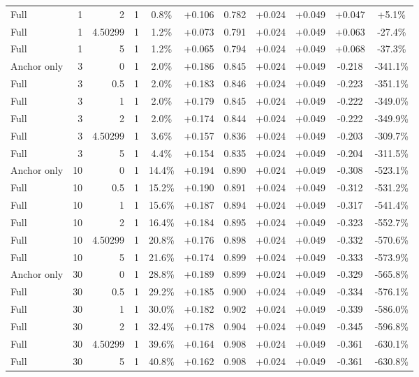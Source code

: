 \begin{table}[htbp]
\begin{tabular}{lrrrccccccc}
Full & 1 & 2 & 1 & 0.8\% & +0.106 & 0.782 & +0.024 & +0.049 & +0.047 & +5.1\% \\
Full & 1 & 4.50299 & 1 & 1.2\% & +0.073 & 0.791 & +0.024 & +0.049 & +0.063 & -27.4\% \\
Full & 1 & 5 & 1 & 1.2\% & +0.065 & 0.794 & +0.024 & +0.049 & +0.068 & -37.3\% \\
Anchor only & 3 & 0 & 1 & 2.0\% & +0.186 & 0.845 & +0.024 & +0.049 & -0.218 & -341.1\% \\
Full & 3 & 0.5 & 1 & 2.0\% & +0.183 & 0.846 & +0.024 & +0.049 & -0.223 & -351.1\% \\
Full & 3 & 1 & 1 & 2.0\% & +0.179 & 0.845 & +0.024 & +0.049 & -0.222 & -349.0\% \\
Full & 3 & 2 & 1 & 2.0\% & +0.174 & 0.844 & +0.024 & +0.049 & -0.222 & -349.9\% \\
Full & 3 & 4.50299 & 1 & 3.6\% & +0.157 & 0.836 & +0.024 & +0.049 & -0.203 & -309.7\% \\
Full & 3 & 5 & 1 & 4.4\% & +0.154 & 0.835 & +0.024 & +0.049 & -0.204 & -311.5\% \\
Anchor only & 10 & 0 & 1 & 14.4\% & +0.194 & 0.890 & +0.024 & +0.049 & -0.308 & -523.1\% \\
Full & 10 & 0.5 & 1 & 15.2\% & +0.190 & 0.891 & +0.024 & +0.049 & -0.312 & -531.2\% \\
Full & 10 & 1 & 1 & 15.6\% & +0.187 & 0.894 & +0.024 & +0.049 & -0.317 & -541.4\% \\
Full & 10 & 2 & 1 & 16.4\% & +0.184 & 0.895 & +0.024 & +0.049 & -0.323 & -552.7\% \\
Full & 10 & 4.50299 & 1 & 20.8\% & +0.176 & 0.898 & +0.024 & +0.049 & -0.332 & -570.6\% \\
Full & 10 & 5 & 1 & 21.6\% & +0.174 & 0.899 & +0.024 & +0.049 & -0.333 & -573.9\% \\
Anchor only & 30 & 0 & 1 & 28.8\% & +0.189 & 0.899 & +0.024 & +0.049 & -0.329 & -565.8\% \\
Full & 30 & 0.5 & 1 & 29.2\% & +0.185 & 0.900 & +0.024 & +0.049 & -0.334 & -576.1\% \\
Full & 30 & 1 & 1 & 30.0\% & +0.182 & 0.902 & +0.024 & +0.049 & -0.339 & -586.0\% \\
Full & 30 & 2 & 1 & 32.4\% & +0.178 & 0.904 & +0.024 & +0.049 & -0.345 & -596.8\% \\
Full & 30 & 4.50299 & 1 & 39.6\% & +0.164 & 0.908 & +0.024 & +0.049 & -0.361 & -630.1\% \\
Full & 30 & 5 & 1 & 40.8\% & +0.162 & 0.908 & +0.024 & +0.049 & -0.361 & -630.8\% \\

\end{tabular}
\end{table}
